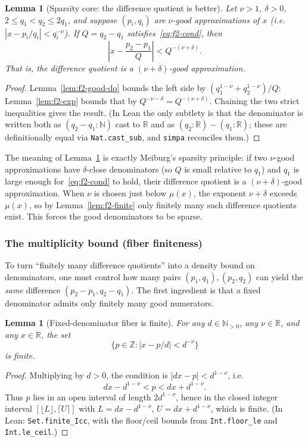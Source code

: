 \documentclass[11pt]{amsart}
\newtheorem{lemma}[theorem]{Lemma}
\theoremstyle{definition}
\theoremstyle{remark}
\numberwithin{equation}{section}
\newcommand{\R}{\mathbb{R}}
\newcommand{\Z}{\mathbb{Z}}
\newcommand{\N}{\mathbb{N}}
\newcommand{\irr}{\mu}
\begin{document}
\begin{lemma}[Sparsity core: the difference quotient is better]\label{lem:f2-core}
Let $\nu>1$, $\delta>0$, $2\le q_1<q_2\le2q_1$, and suppose $(p_i,q_i)$ are $\nu$-good approximations of $x$ (i.e.\ $|x-p_i/q_i|<q_i^{-\nu}$). If $Q=q_2-q_1$ satisfies~\eqref{eq:f2-cond}, then
\[
\left|x-\frac{p_2-p_1}{Q}\right|<Q^{-(\nu+\delta)}.
\]
That is, the difference quotient is a $(\nu+\delta)$-good approximation.
\end{lemma}
\begin{proof}
Lemma~\ref{lem:f2-good-dq} bounds the left side by $(q_1^{1-\nu}+q_2^{1-\nu})/Q$; Lemma~\ref{lem:f2-exp} bounds that by $Q^{-\nu-\delta}=Q^{-(\nu+\delta)}$. Chaining the two strict inequalities gives the result. (In Lean the only subtlety is that the denominator is written both as $(q_2-q_1:\N)$ cast to $\R$ and as $(q_2:\R)-(q_1:\R)$; these are definitionally equal via \texttt{Nat.cast\_sub}, and \texttt{simpa} reconciles them.)
\end{proof}

The meaning of Lemma~\ref{lem:f2-core} is exactly Meiburg's sparsity principle: if two $\nu$-good approximations have $\delta$-close denominators (so $Q$ is small relative to $q_1$) and $q_1$ is large enough for~\eqref{eq:f2-cond} to hold, their difference quotient is a $(\nu+\delta)$-good approximation. When $\nu$ is chosen just below $\irr(x)$, the exponent $\nu+\delta$ exceeds $\irr(x)$, so by Lemma~\ref{lem:f2-finite} only finitely many such difference quotients exist. This forces the good denominators to be sparse.

\subsubsection{The multiplicity bound (fiber finiteness)}

To turn ``finitely many difference quotients'' into a density bound on denominators, one must control how many pairs $(p_1,q_1),(p_2,q_2)$ can yield the \emph{same} difference $(p_2-p_1,q_2-q_1)$. The first ingredient is that a fixed denominator admits only finitely many good numerators.

\begin{lemma}[Fixed-denominator fiber is finite]\label{lem:f2-fiber}
For any $d\in\N_{>0}$, any $\nu\in\R$, and any $x\in\R$, the set
\[
\{p\in\Z:|x-p/d|<d^{-\nu}\}
\]
is finite.
\end{lemma}
\begin{proof}
Multiplying by $d>0$, the condition is $|dx-p|<d^{1-\nu}$, i.e.
\[
dx-d^{1-\nu}<p<dx+d^{1-\nu}.
\]
Thus $p$ lies in an open interval of length $2d^{1-\nu}$, hence in the closed integer interval $[\lfloor L\rfloor,\lceil U\rceil]$ with $L=dx-d^{1-\nu}$, $U=dx+d^{1-\nu}$, which is finite. (In Lean: \texttt{Set.finite\_Icc}, with the floor/ceil bounds from \texttt{Int.floor\_le} and \texttt{Int.le\_ceil}.)
\end{proof}
\end{document}
